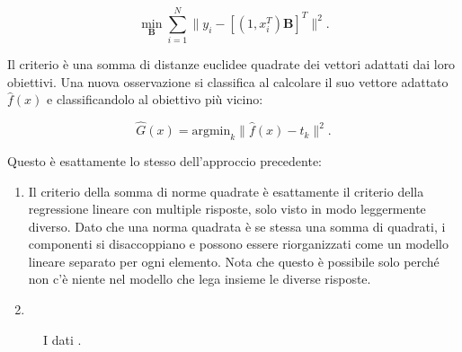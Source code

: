 \documentclass[11pt,openany]{book}
\begin{document}
\begin{equation}
\label{eq4-5}
\min_{\mathbf{B}}{\sum_{i = 1}^{N}{ \lVert y_i - [(1, x_i^T)\mathbf{B}]^T \rVert^2 }}.
\end{equation}

Il criterio è una somma di distanze euclidee quadrate dei vettori adattati dai loro obiettivi. Una nuova osservazione si classifica al calcolare il suo vettore adattato $\hat{f}(x)$ e classificandolo al obiettivo più vicino:

\begin{equation}
\label{eq4-6}
\hat{G}(x) = \text{argmin}_{k}{ \lVert \hat{f}(x) - t_k \rVert^2 }.
\end{equation}

Questo è esattamente lo stesso dell'approccio precedente:
\begin{enumerate}
\item Il criterio della somma di norme quadrate è esattamente il criterio della regressione lineare con multiple risposte, solo visto in modo leggermente diverso. Dato che una norma quadrata è se stessa una somma di quadrati, i componenti si disaccoppiano e possono essere riorganizzati come un modello lineare separato per ogni elemento. Nota che questo è possibile solo perché non c'è niente nel modello che lega insieme le diverse risposte.

\item 

\end{enumerate}

\begin{figure}
\label{fig4-2}
\caption{I dati .}
\end{figure}




\end{document}
